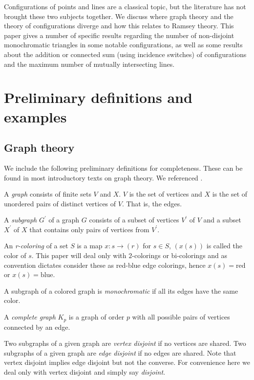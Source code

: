 \documentclass{article}
\theoremstyle{definition}
\theoremstyle{remark}
\theoremstyle{definition}
\begin{document}
Configurations of points and lines are a classical topic, but the literature has not brought these two subjects together. We discuss where graph theory and the theory of configurations diverge and how this relates to Ramsey theory. This paper gives a number of specific results regarding the number of non-disjoint monochromatic triangles in some notable configurations, as well as some results about the addition or connected sum (using incidence switches) of configurations and the maximum number of mutually intersecting lines.


\section{Preliminary definitions and examples}

\subsection{Graph theory} We include the following preliminary definitions for completeness. These can be found in most introductory texts on graph theory. We referenced \cite{harary1969graph}.

A \textit{graph} consists of finite sets $V$ and $X$. $V$ is the set of vertices and $X$ is the set of unordered pairs of distinct vertices of $V$. That is, the edges.

A \textit{subgraph} $G^{\prime}$ of a graph $G$ consists of a subset of vertices $V^{\prime}$ of $V$ and a subset $X^{\prime}$ of $X$ that contains only pairs of vertices from $V^{\prime}$.

An \textit{r-coloring} of a set $S$ is a map $x:s\rightarrow (r)$ for $s\in S$, $(x(s))$ is called the color of $s$. This paper will deal only with $2$-colorings or bi-colorings and as convention dictates consider these as red-blue edge colorings, hence $x(s)=\text{red}$ or $x(s)=\text{blue}$.

A subgraph of a colored graph is \textit{monochromatic} if all its edges have the same color.

A \textit{complete graph} $K_p$ is a graph of order $p$ with all possible pairs of vertices connected by an edge.


Two subgraphs of a given graph are \textit{vertex disjoint} if no vertices are shared. Two subgraphs of a given graph are \textit{edge disjoint} if no edges are shared. Note that vertex disjoint implies edge disjoint but not the converse. For convenience here we deal only with vertex disjoint and simply say \textit{disjoint}.
\end{document}
